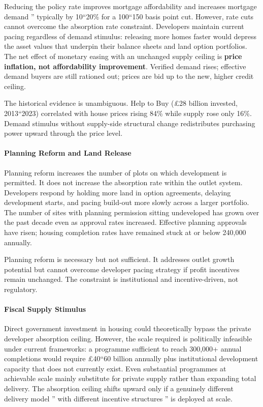 \documentclass[
]{article}
\begin{document}
Reducing the policy rate improves mortgage affordability and increases
mortgage demand '' typically by 10``20\% for a 100``150 basis point cut.
However, rate cuts cannot overcome the absorption rate constraint.
Developers maintain current pacing regardless of demand stimulus:
releasing more homes faster would depress the asset values that underpin
their balance sheets and land option portfolios. The net effect of
monetary easing with an unchanged supply ceiling is \textbf{price
inflation, not affordability improvement}. Verified demand rises;
effective demand buyers are still rationed out; prices are bid up to the
new, higher credit ceiling.

The historical evidence is unambiguous. Help to Buy (£28 billion
invested, 2013``2023) correlated with house prices rising 84\% while
supply rose only 16\%. Demand stimulus without supply-side structural
change redistributes purchasing power upward through the price level.

\paragraph{Planning Reform and Land
Release}\label{planning-reform-and-land-release}

Planning reform increases the number of plots on which development is
permitted. It does not increase the absorption rate within the outlet
system. Developers respond by holding more land in option agreements,
delaying development starts, and pacing build-out more slowly across a
larger portfolio. The number of sites with planning permission sitting
undeveloped has grown over the past decade even as approval rates
increased. Effective planning approvals have risen; housing completion
rates have remained stuck at or below 240,000 annually.

Planning reform is necessary but not sufficient. It addresses outlet
growth potential but cannot overcome developer pacing strategy if profit
incentives remain unchanged. The constraint is institutional and
incentive-driven, not regulatory.

\paragraph{Fiscal Supply Stimulus}\label{fiscal-supply-stimulus}

Direct government investment in housing could theoretically bypass the
private developer absorption ceiling. However, the scale required is
politically infeasible under current frameworks: a programme sufficient
to reach 300,000+ annual completions would require £40``60 billion
annually plus institutional development capacity that does not currently
exist. Even substantial programmes at achievable scale mainly substitute
for private supply rather than expanding total delivery. The absorption
ceiling shifts upward only if a genuinely different delivery model ''
with different incentive structures '' is deployed at scale.
\end{document}
